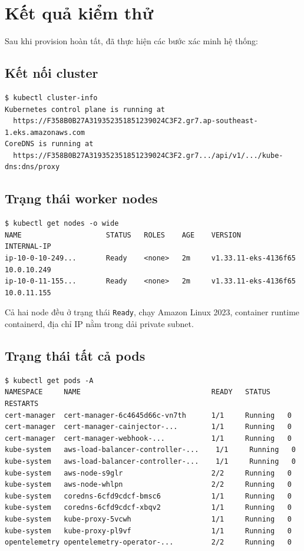 \documentclass[12pt,a4paper]{article}
\begin{document}
\section{Kết quả kiểm thử}

Sau khi provision hoàn tất, đã thực hiện các bước xác minh hệ thống:

\subsection{Kết nối cluster}

\begin{lstlisting}[caption={Xác minh kết nối đến EKS}]
$ kubectl cluster-info
Kubernetes control plane is running at
  https://F358B0B27A319352351851239024C3F2.gr7.ap-southeast-1.eks.amazonaws.com
CoreDNS is running at
  https://F358B0B27A319352351851239024C3F2.gr7.../api/v1/.../kube-dns:dns/proxy
\end{lstlisting}

\subsection{Trạng thái worker nodes}

\begin{lstlisting}[caption={Danh sách nodes — tất cả Ready}]
$ kubectl get nodes -o wide
NAME                    STATUS   ROLES    AGE    VERSION              INTERNAL-IP
ip-10-0-10-249...       Ready    <none>   2m     v1.33.11-eks-4136f65 10.0.10.249
ip-10-0-11-155...       Ready    <none>   2m     v1.33.11-eks-4136f65 10.0.11.155
\end{lstlisting}

Cả hai node đều ở trạng thái \texttt{Ready}, chạy Amazon Linux 2023, container runtime containerd, địa chỉ IP nằm trong dải private subnet.

\subsection{Trạng thái tất cả pods}

\begin{lstlisting}[caption={Toàn bộ pods đều Running, không restart}]
$ kubectl get pods -A
NAMESPACE     NAME                               READY   STATUS    RESTARTS
cert-manager  cert-manager-6c4645d66c-vn7th      1/1     Running   0
cert-manager  cert-manager-cainjector-...        1/1     Running   0
cert-manager  cert-manager-webhook-...           1/1     Running   0
kube-system   aws-load-balancer-controller-...    1/1     Running   0
kube-system   aws-load-balancer-controller-...    1/1     Running   0
kube-system   aws-node-s9glr                     2/2     Running   0
kube-system   aws-node-whlpn                     2/2     Running   0
kube-system   coredns-6cfd9cdcf-bmsc6            1/1     Running   0
kube-system   coredns-6cfd9cdcf-xbqv2            1/1     Running   0
kube-system   kube-proxy-5vcwh                   1/1     Running   0
kube-system   kube-proxy-pl9vf                   1/1     Running   0
opentelemetry opentelemetry-operator-...         2/2     Running   0
\end{lstlisting}
\end{document}
